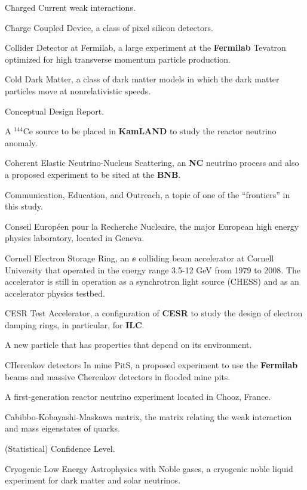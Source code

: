  Charged Current weak interactions.
 
 Charge Coupled Device,  a class of pixel silicon detectors.

  Collider Detector at  Fermilab,  a large experiment at the 
{\bf Fermilab} Tevatron optimized for high transverse momentum 
particle production.

  Cold Dark Matter, a class of dark matter models in which 
the dark matter particles move at nonrelativistic speeds.


 Conceptual Design Report.

 A $^{144}$Ce source to be placed in {\bf KamLAND} to
study the reactor neutrino anomaly.

 Coherent Elastic Neutrino-Nucleus Scattering, an {\bf NC}
neutrino process and also a proposed experiment to be sited at the {\bf BNB}.

  Communication, Education, and Outreach, a topic 
of one of the ``frontiers'' in this study.

  Conseil Europ\'een pour la Recherche
Nucleaire, the major European high energy physics laboratory, located
in Geneva.

 Cornell Electron Storage Ring, an $\ee$ colliding
beam accelerator at Cornell University that operated in the energy
range 3.5-12 GeV from 1979 to 2008.  The accelerator
is still in operation as a synchrotron light source (CHESS) and as an
accelerator physics testbed.

  CESR Test Accelerator, a configuration of  
{\bf CESR} to study the design of electron damping rings, in 
particular, for {\bf ILC}. 

  A new particle that has properties that 
depend on its environment.

 CHerenkov detectors In mine PitS, a
 proposed experiment to use the {\bf Fermilab} beams and  
massive Cherenkov detectors in flooded mine pits.

 A first-generation reactor neutrino experiment
 located in Chooz, France.

 Cabibbo-Kobayashi-Maskawa matrix, the matrix
  relating the weak interaction and mass eigenstates of quarks.

 (Statistical) Confidence Level.
 
 Cryogenic Low Energy Astrophysics with Noble gases, 
a cryogenic noble liquid experiment for dark matter and solar neutrinos.


